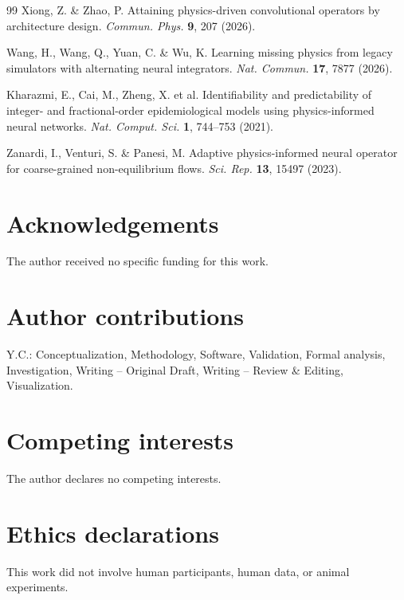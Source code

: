 \documentclass[11pt,a4paper]{article}
\begin{document}
\begin{thebibliography}{99}
 Xiong, Z. \& Zhao, P. Attaining physics-driven convolutional operators by architecture design. \emph{Commun. Phys.} \textbf{9}, 207 (2026).

 Wang, H., Wang, Q., Yuan, C. \& Wu, K. Learning missing physics from legacy simulators with alternating neural integrators. \emph{Nat. Commun.} \textbf{17}, 7877 (2026).

 Kharazmi, E., Cai, M., Zheng, X. et al. Identifiability and predictability of integer- and fractional-order epidemiological models using physics-informed neural networks. \emph{Nat. Comput. Sci.} \textbf{1}, 744--753 (2021).

 Zanardi, I., Venturi, S. \& Panesi, M. Adaptive physics-informed neural operator for coarse-grained non-equilibrium flows. \emph{Sci. Rep.} \textbf{13}, 15497 (2023).

\end{thebibliography}

\section*{Acknowledgements}
The author received no specific funding for this work.

\section*{Author contributions}
Y.C.: Conceptualization, Methodology, Software, Validation, Formal analysis, Investigation, Writing -- Original Draft, Writing -- Review \& Editing, Visualization.

\section*{Competing interests}
The author declares no competing interests.

\section*{Ethics declarations}
This work did not involve human participants, human data, or animal experiments.
\end{document}
